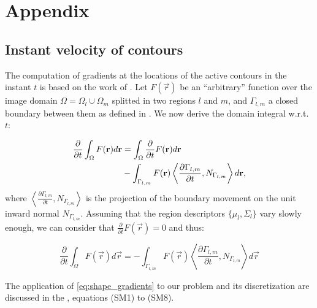 \renewcommand{\theequation}{A.\arabic{equation}}
\renewcommand{\thesubsection}{Appendix \arabic{subsection}}

\section*{Appendix}

\subsection{Instant velocity of contours}
\label{app:shape_priors}
The computation of gradients at the locations of the active contours in the
  instant $t$ is based on the work of \cite{herbulot_segmentation_2006}.
Let $F(\vec{r})$ be an ``arbitrary'' function over the image domain
  $\Omega = \Omega_l \cup \Omega_m$ splitted in two regions $l$ and
  $m$, and $\Gamma_{l,m}$ a closed boundary between them
  as defined in .
We now derive the domain integral w.r.t. $t$:

  \begin{align*}
  \frac{\partial}{\partial t} \int_\Omega F(\vec{r}) d\vec{r} &=
  \int_\Omega \frac{\partial}{\partial t}F(\vec{r}) d\vec{r} \notag\\
  &- \int_{\Gamma_{l,m}} F(\vec{r}) \left\langle \frac{\partial \Gamma_{l,m} }{\partial t},
  N_{\Gamma_{l,m}}\right\rangle d\vec{r},
  \end{align*}
%
  where $\left\langle\frac{\partial\Gamma_{l,m}}{\partial t}, N_{\Gamma_{l,m}}\right\rangle$ is
  the projection of the boundary movement on the unit inward normal $N_{\Gamma_{l,m}}$.
Assuming that the region descriptors $\{\mu_l, \Sigma_l\}$ vary slowly enough, we can consider
  that $\frac{\partial}{\partial t} F(\vec{r}) = 0$ and thus:

  \begin{equation}
  \frac{\partial}{\partial t} \int_\Omega F(\vec{r}) d\vec{r} =
  - \int_{\Gamma_{l,m}} F(\vec{r}) \left\langle \frac{\partial \Gamma_{l,m} }{\partial t},
  N_{\Gamma_{l,m}}\right\rangle d\vec{r}
  \label{eq:shape_gradients}
  \end{equation}

  The application of \eqref{eq:shape_gradients} to our problem and its discretization are
    discussed in the , equations (SM1) to (SM8).

